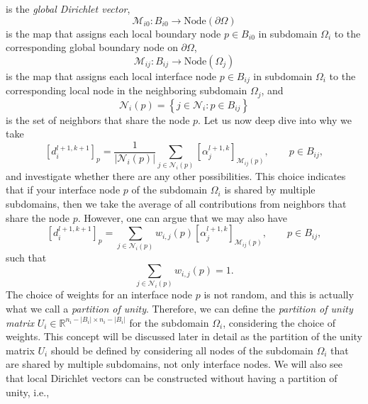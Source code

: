 \documentclass[a4paper, 11pt]{article}
\theoremstyle{plain}
\theoremstyle{definition}
\theoremstyle{remark}
\begin{document}
is the \textit{global Dirichlet vector},
\begin{equation*}
    \mathcal{M}_{i0} : B_{i0} \to \text{Node}(\partial\Omega)
\end{equation*}
is the map that assigns each local boundary node $p \in B_{i0}$ in subdomain $\Omega_i$ to the corresponding global boundary node on $\partial\Omega$,
\begin{equation*}
    \mathcal{M}_{ij} : B_{ij} \to \text{Node}(\Omega_{j})
\end{equation*}
is the map that assigns each local interface node $p \in B_{ij}$ in subdomain $\Omega_i$ to the corresponding local node in the neighboring subdomain $\Omega_j$, and
\begin{equation*}
    \mathcal{N}_{i}(p) = \left\{j \in \mathcal{N}_{i}: p\in B_{ij}\right\}
\end{equation*}
is the set of neighbors that share the node $p$. Let us now deep dive into why we take 
\begin{equation*}
    \left[d^{l+1, k+1}_{i}\right]_{p} = \dfrac{1}{\lvert \mathcal{N}_{i}(p)\rvert}\sum\limits_{j\in\mathcal{N}_{i}(p)}\left[\alpha^{l+1, k}_{j}\right]_{\mathcal{M}_{ij}(p)}, \qquad p\in B_{ij},
\end{equation*}
and investigate whether there are any other possibilities. This choice indicates that if your interface node $p$ of the subdomain $\Omega_{i}$ is shared by multiple subdomains, then we take the average of all contributions from neighbors that share the node $p$. However, one can argue that we may also have
\begin{equation*}
    \left[d^{l+1, k+1}_{i}\right]_{p} = \sum\limits_{j\in\mathcal{N}_{i}(p)} w_{i, j}(p)\left[\alpha^{l+1, k}_{j}\right]_{\mathcal{M}_{ij}(p)}, \qquad p\in B_{ij},
\end{equation*}
such that
\begin{equation*}
    \sum_{j\in\mathcal{N}_{i}(p)}w_{i, j}(p) = 1.
\end{equation*}
The choice of weights for an interface node $p$ is not random, and this is actually what we call a \textit{partition of unity}. Therefore, we can define the \textit{partition of unity matrix} $U_{i}\in \mathbb{R}^{n_{i} - \lvert B_{i}\rvert \times n_{i} - \lvert B_{i}\rvert}$ for the subdomain $\Omega_{i}$, considering the choice of weights. This concept will be discussed later in detail as the partition of the unity matrix $U_{i}$ should be defined by considering all nodes of the subdomain $\Omega_{i}$ that are shared by multiple subdomains, not only interface nodes. We will also see that local Dirichlet vectors can be constructed without having a partition of unity, i.e.,
\end{document}
